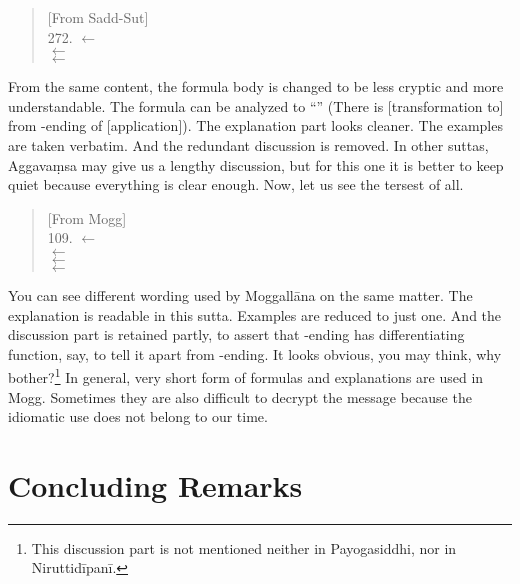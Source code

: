 \begin{quote}
[From Sadd-Sut] \\
272.  $\leftarrow$  \\
 $\leftarrow$  \\
 $\leftarrow$  \\
\end{quote}

From the same content, the formula body is changed to be less cryptic and more understandable. The formula  can be analyzed to ``'' (There is [transformation to]  from -ending of  [application]). The explanation part looks cleaner. The examples are taken verbatim. And the redundant discussion is removed. In other suttas, Aggava\d msa may give us a lengthy discussion, but for this one it is better to keep quiet because everything is clear enough. Now, let us see the tersest of all.

\begin{quote}
[From Mogg] \\
109.  $\leftarrow$  \\
 $\leftarrow$  \\
 $\leftarrow$  \\
 $\leftarrow$  \\
\end{quote}

You can see different wording used by Moggall\=ana on the same matter. The explanation is readable in this sutta. Examples are reduced to just one. And the discussion part is retained partly, to assert that -ending has differentiating function, say, to tell it apart from -ending. It looks obvious, you may think, why bother?\footnote{This discussion part is not mentioned neither in Payogasiddhi, nor in Niruttid\=ipan\=i.} In general, very short form of formulas and explanations are used in Mogg. Sometimes they are also difficult to decrypt the message because the idiomatic use does not belong to our time.

\section*{Concluding Remarks}

